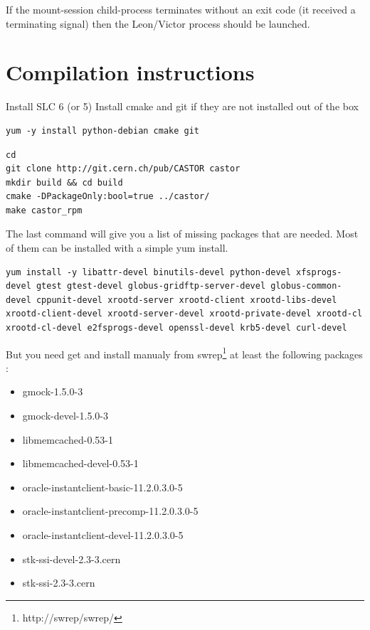 If the mount-session child-process terminates without an exit code (it received a terminating signal) then the Leon/Victor process should be launched.

\section{Compilation instructions}

Install SLC 6 (or 5)
Install cmake and git if they are not installed out of the box
\begin{table}[h]
\begin{lstlisting}
yum -y install python-debian cmake git
\end{lstlisting}
\end{table}

\begin{table}[h]
\begin{lstlisting}
cd 
git clone http://git.cern.ch/pub/CASTOR castor
mkdir build && cd build
cmake -DPackageOnly:bool=true ../castor/
make castor_rpm
\end{lstlisting}
\end{table}
The last command will give you a list of missing packages that are needed.
Most of them can be installed with a simple yum install.

\begin{table}[h]
\begin{lstlisting}
yum install -y libattr-devel binutils-devel python-devel xfsprogs-devel gtest gtest-devel globus-gridftp-server-devel globus-common-devel cppunit-devel xrootd-server xrootd-client xrootd-libs-devel xrootd-client-devel xrootd-server-devel xrootd-private-devel xrootd-cl xrootd-cl-devel e2fsprogs-devel openssl-devel krb5-devel curl-devel
\end{lstlisting}
\end{table}


But you need get and install manualy from swrep\footnote{http://swrep/swrep/} at least the following packages :
\begin{itemize}[noitemsep]
 \item gmock-1.5.0-3
 \item gmock-devel-1.5.0-3
 \item libmemcached-0.53-1
 \item libmemcached-devel-0.53-1
 \item oracle-instantclient-basic-11.2.0.3.0-5
 \item oracle-instantclient-precomp-11.2.0.3.0-5 
 \item oracle-instantclient-devel-11.2.0.3.0-5  
 \item stk-ssi-devel-2.3-3.cern
 \item stk-ssi-2.3-3.cern
\end{itemize}


